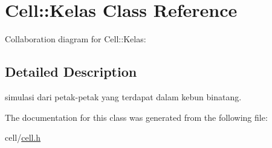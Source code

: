 \hypertarget{classCell_1_1Kelas}{}\section{Cell\+:\+:Kelas Class Reference}
\label{classCell_1_1Kelas}


Collaboration diagram for Cell\+:\+:Kelas\+:


\subsection{Detailed Description}
simulasi dari petak-\/petak yang terdapat dalam kebun binatang. 

The documentation for this class was generated from the following file\+:\begin{DoxyCompactItemize}
\item 
cell/\hyperlink{cell_8h}{cell.\+h}\end{DoxyCompactItemize}
